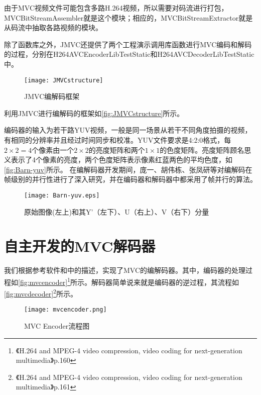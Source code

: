 由于MVC视频文件可能包含多路H.264视频，所以需要对码流进行打包，MVCBitStreamAssembler就是这个模块；相应的，MVCBitStreamExtractor就是从码流中抽取各路视频的模块。

除了函数库之外，JMVC还提供了两个工程演示调用库函数进行MVC编码和解码的过程，分别在H264AVCEncoderLibTestStatic和H264AVCDecoderLibTestStatic中。

\begin{figure}[htbp]
\begin{center}
\texttt{[image: JMVCstructure]}
\caption{JMVC编解码框架}
\label{fig:JMVCstructure}
\end{center}
\end{figure}

利用JMVC进行编解码的框架如\autoref{fig:JMVCstructure}所示。

编码器的输入为若干路YUV视频，一般是同一场景从若干不同角度拍摄的视频，有相同的分辨率并且经过时间同步和校准。YUV文件要求是4:2:0格式，每$2\times2=4$个像素由一个$2\times2$的亮度矩阵和两个$1\times1$的色度矩阵。亮度矩阵顾名思义表示了4个像素的亮度，两个色度矩阵表示像素红蓝两色的平均色度，如\autoref{fig:Barn-yuv}所示。
在编解码器开发期间，庞一、胡伟栋、张凤研等对编解码在帧级别的并行性进行了深入研究\cite{pang2009adaptive,yi2008parallelized}，并在编码器和解码器中都采用了帧并行的算法。

\begin{figure}[htbp]
\begin{center}
\texttt{[image: Barn-yuv.eps]}
\caption{原始图像(左上)和其Y'（左下）、U（右上）、V（右下）分量}
\label{fig:Barn-yuv}
\end{center}
\end{figure}

\section{自主开发的MVC解码器}
\label{sec:mvcdecoder}

我们根据参考软件和中的描述，实现了MVC的编解码器。其中，编码器的处理过程如\autoref{fig:mvcencoder}\footnote{《H.264 and MPEG-4 video compression, video coding for next-generation multimedia》\cite{richardson2003h}p.160}所示。解码器简单说来就是编码器的逆过程，其流程如\autoref{fig:mvcdecoder}\footnote{《H.264 and MPEG-4 video compression, video coding for next-generation multimedia》\cite{richardson2003h}p.161}所示。

\begin{figure}[htbp]
\begin{center}
\texttt{[image: mvcencoder.png]}
\caption{MVC Encoder流程图}
\label{fig:mvcencoder}
\end{center}
\end{figure}

